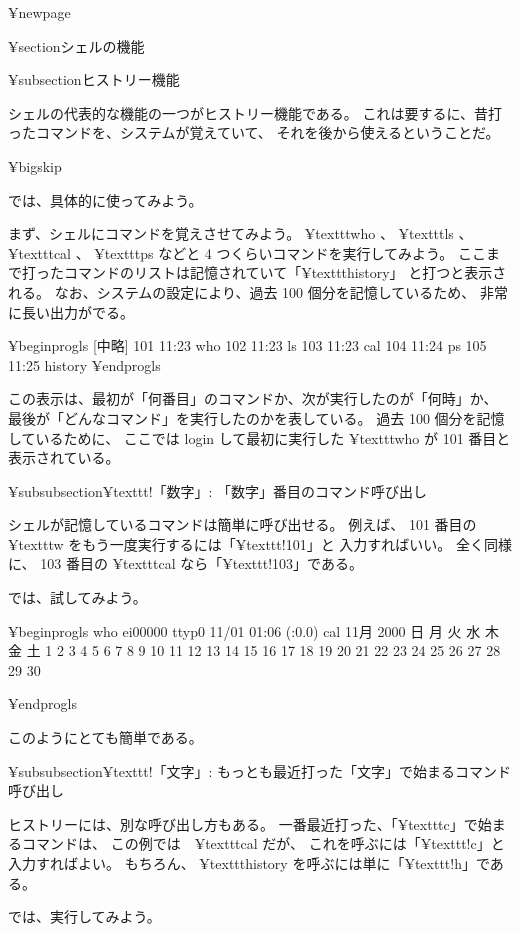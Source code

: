 ¥newpage

¥section{シェルの機能}

¥subsection{ヒストリー機能}

シェルの代表的な機能の一つがヒストリー機能である。
これは要するに、昔打ったコマンドを、システムが覚えていて、
それを後から使えるということだ。

¥bigskip

では、具体的に使ってみよう。

まず、シェルにコマンドを覚えさせてみよう。
¥texttt{who} 、 ¥texttt{ls} 、 ¥texttt{cal} 、 ¥texttt{ps} などと
 4 つくらいコマンドを実行してみよう。
ここまで打ったコマンドのリストは記憶されていて「¥texttt{history}」
と打つと表示される。
なお、システムの設定により、過去 100 個分を記憶しているため、
非常に長い出力がでる。

¥begin{progls}
 [中略]
   101  11:23   who
   102  11:23   ls
   103  11:23   cal
   104  11:24   ps
   105  11:25   history
%
¥end{progls}

この表示は、最初が「何番目」のコマンドか、次が実行したのが「何時」か、
最後が「どんなコマンド」を実行したのかを表している。
過去 100 個分を記憶しているために、
ここでは login して最初に実行した ¥texttt{who} が 101 番目と表示されている。

¥subsubsection{¥texttt{!「数字」}: 「数字」番目のコマンド呼び出し}

シェルが記憶しているコマンドは簡単に呼び出せる。
例えば、 101 番目の ¥texttt{w} をもう一度実行するには「¥texttt{!101}」と
入力すればいい。
全く同様に、 103 番目の ¥texttt{cal} なら「¥texttt{!103}」である。

では、試してみよう。

¥begin{progls}
who
ei00000  ttyp0    11/01 01:06   (:0.0)
cal
     11月 2000
日 月 火 水 木 金 土
          1  2  3  4
 5  6  7  8  9 10 11
12 13 14 15 16 17 18
19 20 21 22 23 24 25
26 27 28 29 30

%
¥end{progls}

このようにとても簡単である。

¥subsubsection{¥texttt{!「文字」}: もっとも最近打った「文字」で始まるコマンド呼び出し}

ヒストリーには、別な呼び出し方もある。
一番最近打った、「¥texttt{c}」で始まるコマンドは、
この例では　¥texttt{cal} だが、
これを呼ぶには「¥texttt{!c}」と入力すればよい。
もちろん、 ¥texttt{history} を呼ぶには単に「¥texttt{!h}」である。

では、実行してみよう。

